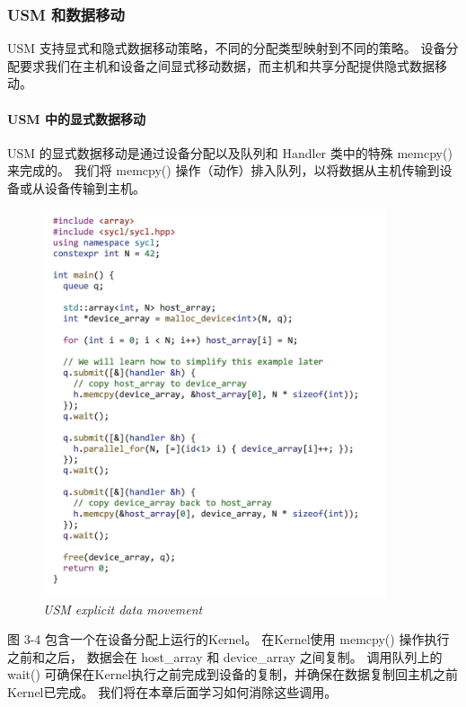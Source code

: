 \subsubsection{USM 和数据移动}
USM 支持显式和隐式数据移动策略，不同的分配类型映射到不同的策略。 
设备分配要求我们在主机和设备之间显式移动数据，而主机和共享分配提供隐式数据移动。

\paragraph{USM 中的显式数据移动}

USM 的显式数据移动是通过设备分配以及队列和 Handler 类中的特殊 memcpy() 来完成的。 
我们将 memcpy() 操作（动作）排入队列，以将数据从主机传输到设备或从设备传输到主机。

\begin{figure}[H]
	\centering
	\includegraphics[width=0.9\textwidth]{figs/F3.4.png}
	\caption{\textit{USM explicit data movement}}
\end{figure}

图 3-4 包含一个在设备分配上运行的Kernel。 在Kernel使用 memcpy() 操作执行之前和之后，
数据会在 host\_array 和 device\_array 之间复制。 
调用队列上的 wait() 可确保在Kernel执行之前完成到设备的复制，并确保在数据复制回主机之前Kernel已完成。 
我们将在本章后面学习如何消除这些调用。

